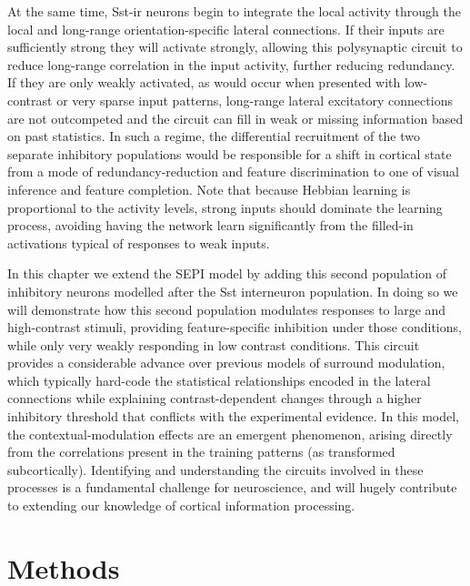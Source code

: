 At the same time, Sst-ir neurons begin to integrate the local activity
through the local and long-range orientation-specific lateral
connections. If their inputs are sufficiently strong they will
activate strongly, allowing this polysynaptic circuit to reduce
long-range correlation in the input activity, further reducing
redundancy. If they are only weakly activated, as would occur when
presented with low-contrast or very sparse input patterns, long-range
lateral excitatory connections are not outcompeted and the circuit can
fill in weak or missing information based on past statistics. In such
a regime, the differential recruitment of the two separate inhibitory
populations would be responsible for a shift in cortical state from a
mode of redundancy-reduction and feature discrimination to one of
visual inference and feature completion.  Note that because Hebbian
learning is proportional to the activity levels, strong inputs should
dominate the learning process, avoiding having the network learn
significantly from the filled-in activations typical of responses to
weak inputs.

In this chapter we extend the SEPI model by adding
this second population of inhibitory neurons modelled after the Sst
interneuron population. In doing so we will demonstrate how this
second population modulates responses to large and high-contrast stimuli, providing
feature-specific inhibition under those conditions, while only very
weakly responding in low contrast conditions. This circuit provides a
considerable advance over previous models of surround modulation,
which typically hard-code the statistical relationships encoded in the lateral
connections while explaining contrast-dependent changes through a
higher inhibitory threshold that conflicts with the experimental
evidence. In this model, the contextual-modulation effects are an emergent
phenomenon, arising directly from the correlations present in the training
patterns (as transformed subcortically).
Identifying and understanding the circuits involved in these
processes is a fundamental challenge for neuroscience, and will hugely
contribute to extending our knowledge of cortical information
processing.

\section{Methods}

